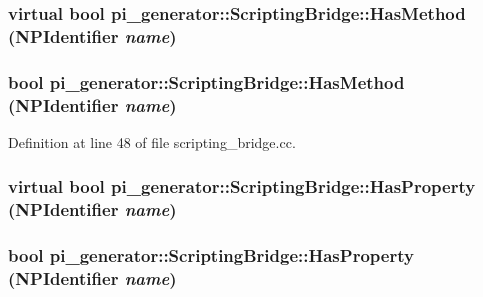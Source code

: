 \hypertarget{classpi__generator_1_1_scripting_bridge_a5da4e0d7d9a2fe59b4838a40503a5a2e}{
\subsubsection[{HasMethod}]{\setlength{\rightskip}{0pt plus 5cm}virtual bool pi\_\-generator::ScriptingBridge::HasMethod (NPIdentifier {\em name})}}
\label{classpi__generator_1_1_scripting_bridge_a5da4e0d7d9a2fe59b4838a40503a5a2e}
\hypertarget{classpi__generator_1_1_scripting_bridge_aaa99f91c8ced5df6fac0700516cdd058}{
\subsubsection[{HasMethod}]{\setlength{\rightskip}{0pt plus 5cm}bool pi\_\-generator::ScriptingBridge::HasMethod (NPIdentifier {\em name})}}
\label{classpi__generator_1_1_scripting_bridge_aaa99f91c8ced5df6fac0700516cdd058}


Definition at line 48 of file scripting\_\-bridge.cc.

\hypertarget{classpi__generator_1_1_scripting_bridge_adbcb9a1bd7516d027a55aabd1ab60cf1}{
\subsubsection[{HasProperty}]{\setlength{\rightskip}{0pt plus 5cm}virtual bool pi\_\-generator::ScriptingBridge::HasProperty (NPIdentifier {\em name})}}
\label{classpi__generator_1_1_scripting_bridge_adbcb9a1bd7516d027a55aabd1ab60cf1}
\hypertarget{classpi__generator_1_1_scripting_bridge_a55f52d9e5e377367881e919db10b019f}{
\subsubsection[{HasProperty}]{\setlength{\rightskip}{0pt plus 5cm}bool pi\_\-generator::ScriptingBridge::HasProperty (NPIdentifier {\em name})}}
\label{classpi__generator_1_1_scripting_bridge_a55f52d9e5e377367881e919db10b019f}


